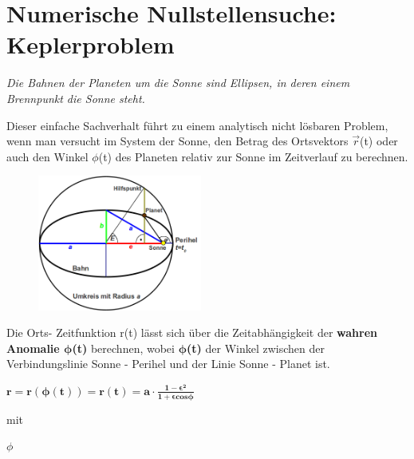 \documentclass{scrartcl}	    %
\begin{document}

\section*{Numerische Nullstellensuche: Keplerproblem}
\emph{Die Bahnen der Planeten um die Sonne sind Ellipsen, in deren einem Brennpunkt die Sonne steht.}

Dieser einfache Sachverhalt führt zu einem analytisch nicht lösbaren Problem, wenn man versucht im System der Sonne, den Betrag des Ortsvektors $\vec{r}$(t) oder auch den Winkel $\phi$(t) des Planeten relativ zur Sonne im Zeitverlauf zu berechnen.

\begin{figure}
\includegraphics[width=0.48\textwidth]{Kepler_Schema.png}
\end{figure}

Die Orts- Zeitfunktion r(t) lässt sich über
die Zeitabhängigkeit der \textbf{wahren Anomalie
$\boldsymbol{\phi}$(t)} berechnen, wobei $\boldsymbol{\phi}$\textbf{(t)} der Winkel zwischen der Verbindungslinie Sonne - Perihel und der Linie Sonne - Planet ist.

$\mathbf{ r = r(\phi (t)) = r(t) = a \cdot \frac{1-\epsilon^2}{1+\epsilon cos \phi}}$

mit

$\phi$ 
\end{document}
